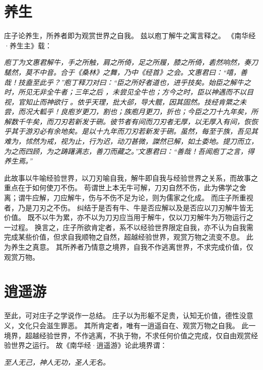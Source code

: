 \documentclass[11pt]{article}
\begin{document}
\section{养生}
庄子论养生，所养者即为观赏世界之自我。
兹以庖丁解牛之寓言释之。
《南华经·养生主》载：

\textit{庖丁为文惠君解牛，手之所触，肩之所倚，足之所履，膝之所倚，砉然响然，奏刀騞然，莫不中音。合于《桑林》之舞，乃中《经首》之会。文惠君曰：“嘻，善哉！技盍至此乎？”庖丁释刀对曰：“臣之所好者道也，进乎技矣。始臣之解牛之时，所见无非全牛者；三年之后 ，未尝见全牛也；方今之时，臣以神遇而不以目视，官知止而神欲行 。依乎天理，批大郤，导大髋，因其固然。技经肯綮之未尝，而况大軱乎！良庖岁更刀，割也；族庖月更刀，折也；今臣之刀十九年矣，所解数千牛矣，而刀刃若新发于硎。彼节者有间而刀刃者无厚，以无厚入有间，恢恢乎其于游刃必有余地矣。是以十九年而刀刃若新发于硎。虽然，每至于族，吾见其难为，怵然为戒，视为止，行为迟，动刀甚微，謋然已解，如土委地。提刀而立，为之而四顾，为之踌躇满志，善刀而藏之。”文惠君曰：“善哉！吾闻庖丁之言，得养生焉。”}

此故事以牛喻经验世界，以刀刃喻自我，解牛即自我与经验世界之关系，而故事之重点在于如何使刀不伤。
苟谓世上本无牛可解，刀刃自然不伤，此为佛学之舍离；谓牛应解，刀应解牛，伤与不伤不足为论，则为儒家之化成。
而庄子所重视者，乃是刀刃之不伤。
纠结于是否有牛、牛是否应解以及是否应以刀刃解牛皆无价值。
既不以牛为累，亦不以为刀刃应当用于解牛，仅以刀刃解牛为万物运行之一过程。
换言之，庄子所欲肯定者，系不以经验世界限定自我，亦不认为自我需完成某些价值，但求自我顺物之自然，超越经验世界，观赏万物之流变不息。
此为养生之真意。
其所养者乃情意之境界，自我不作逃离世界，不求完成价值，仅观赏万物。

\section{逍遥游}
至此，可对庄子之学说作一总结。
庄子以为形躯不足贵，认知无价值，德性没意义，文化只会滋生罪恶。
其所肯定者，唯有一逍遥自在、观赏万物之自我。
此一境界，超越经验世界，不作逃离，不执于物，不求任何价值之完成，仅自由观赏经验世界之运行。
故《南华经·逍遥游》论此境界谓：

\textit{至人无己，神人无功，圣人无名。}
  
\end{document}
